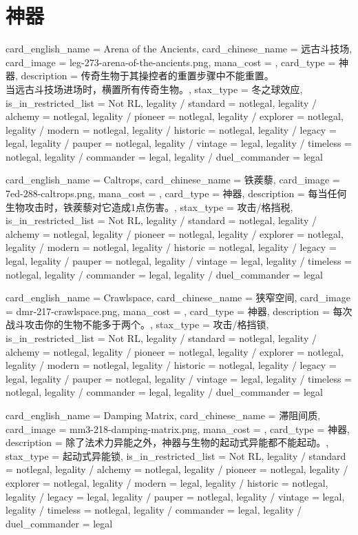 \documentclass[lang = cn, color = black, 10pt]{AllThatStax}
\begin{document}
\section{神器}

\card
{
	card_english_name = {Arena of the Ancients},
	card_chinese_name = {远古斗技场},
	card_image = leg-273-arena-of-the-ancients.png,
	mana_cost = ,
	card_type = 神器,
	description = {传奇生物于其操控者的重置步骤中不能重置。\\
当远古斗技场进场时，横置所有传奇生物。},
	stax_type = 冬之球效应,
	is_in_restricted_list = Not RL,
	legality / standard = notlegal,
	legality / alchemy = notlegal,
	legality / pioneer = notlegal,
	legality / explorer = notlegal,
	legality / modern = notlegal,
	legality / historic = notlegal,
	legality / legacy = legal,
	legality / pauper = notlegal,
	legality / vintage = legal,
	legality / timeless = notlegal,
	legality / commander = legal,
	legality / duel_commander = legal
}

\card
{
	card_english_name = {Caltrops},
	card_chinese_name = {铁蒺藜},
	card_image = 7ed-288-caltrops.png,
	mana_cost = ,
	card_type = 神器,
	description = {每当任何生物攻击时，铁蒺藜对它造成1点伤害。},
	stax_type = 攻击/格挡税,
	is_in_restricted_list = Not RL,
	legality / standard = notlegal,
	legality / alchemy = notlegal,
	legality / pioneer = notlegal,
	legality / explorer = notlegal,
	legality / modern = notlegal,
	legality / historic = notlegal,
	legality / legacy = legal,
	legality / pauper = notlegal,
	legality / vintage = legal,
	legality / timeless = notlegal,
	legality / commander = legal,
	legality / duel_commander = legal
}

\card
{
	card_english_name = {Crawlspace},
	card_chinese_name = {狭窄空间},
	card_image = dmr-217-crawlspace.png,
	mana_cost = ,
	card_type = 神器,
	description = {每次战斗攻击你的生物不能多于两个。},
	stax_type = 攻击/格挡锁,
	is_in_restricted_list = Not RL,
	legality / standard = notlegal,
	legality / alchemy = notlegal,
	legality / pioneer = notlegal,
	legality / explorer = notlegal,
	legality / modern = notlegal,
	legality / historic = notlegal,
	legality / legacy = legal,
	legality / pauper = notlegal,
	legality / vintage = legal,
	legality / timeless = notlegal,
	legality / commander = legal,
	legality / duel_commander = legal
}

\card
{
	card_english_name = {Damping Matrix},
	card_chinese_name = {滞阻间质},
	card_image = mm3-218-damping-matrix.png,
	mana_cost = ,
	card_type = 神器,
	description = {除了法术力异能之外，神器与生物的起动式异能都不能起动。},
	stax_type = 起动式异能锁,
	is_in_restricted_list = Not RL,
	legality / standard = notlegal,
	legality / alchemy = notlegal,
	legality / pioneer = notlegal,
	legality / explorer = notlegal,
	legality / modern = legal,
	legality / historic = notlegal,
	legality / legacy = legal,
	legality / pauper = notlegal,
	legality / vintage = legal,
	legality / timeless = notlegal,
	legality / commander = legal,
	legality / duel_commander = legal
}
\end{document}
